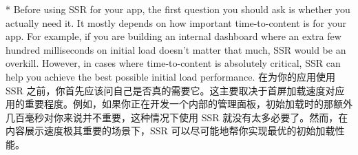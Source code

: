 \begin{paracol}{2}
\switchcolumn[0]*%
Before using SSR for your app, the first question you should ask is
whether you actually need it. It mostly depends on how important
time-to-content is for your app. For example, if you are building an
internal dashboard where an extra few hundred milliseconds on initial
load doesn't matter that much, SSR would be an overkill. However, in
cases where time-to-content is absolutely critical, SSR can help you
achieve the best possible initial load performance.
\switchcolumn
在为你的应用使用 SSR
之前，你首先应该问自己是否真的需要它。这主要取决于首屏加载速度对应用的重要程度。例如，如果你正在开发一个内部的管理面板，初始加载时的那额外几百毫秒对你来说并不重要，这种情况下使用
SSR 就没有太多必要了。然而，在内容展示速度极其重要的场景下，SSR
可以尽可能地帮你实现最优的初始加载性能。
\end{paracol}


